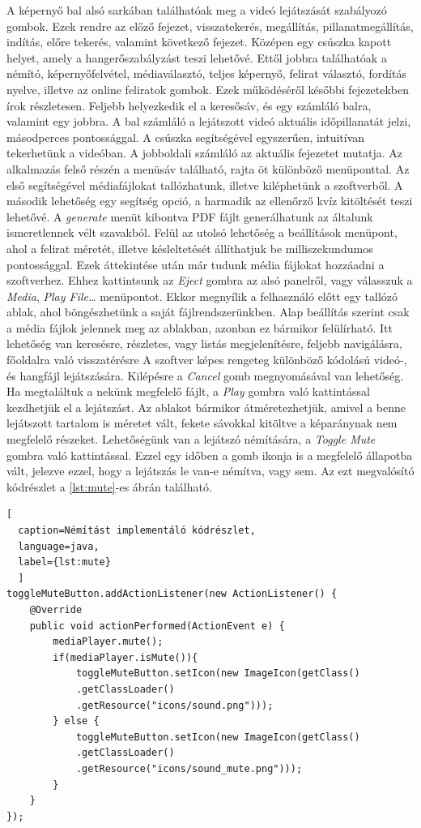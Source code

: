 A képernyő bal alsó sarkában találhatóak meg a videó lejátszását szabályozó gombok. Ezek rendre az előző fejezet, visszatekerés, megállítás, pillanatmegállítás, indítás, előre tekerés, valamint következő fejezet. Középen egy csúszka kapott helyet, amely a hangerőszabályzást teszi lehetővé. Ettől jobbra találhatóak a némító, képernyőfelvétel, médiaválasztó, teljes képernyő, felirat választó, fordítás nyelve, illetve az online feliratok gombok. Ezek működéséről későbbi fejezetekben írok részletesen. Feljebb helyezkedik el a keresősáv, és egy számláló balra, valamint egy jobbra. A bal számláló a lejátszott videó aktuális időpillanatát jelzi, másodperces pontossággal. A csúszka segítségével egyszerűen, intuitívan tekerhetünk a videóban. A jobboldali számláló az aktuális fejezetet mutatja. Az alkalmazás felső részén a menüsáv található, rajta öt különböző menüponttal. Az első segítségével médiafájlokat tallózhatunk, illetve kiléphetünk a szoftverből. A második lehetőség egy segítség opció, a harmadik az ellenőrző kvíz kitöltését teszi lehetővé. A \textit{generate} menüt kibontva PDF fájlt generálhatunk az általunk ismeretlennek vélt szavakból. Felül az utolsó lehetőség a beállítások menüpont, ahol a felirat méretét, illetve késleltetését állíthatjuk be milliszekundumos pontossággal. Ezek áttekintése után már tudunk média fájlokat hozzáadni a szoftverhez. Ehhez kattintsunk az \textit{Eject} gombra az alsó panelről, vagy válasszuk a \textit{Media}, \textit{Play File…} menüpontot. Ekkor megnyílik a felhasználó előtt egy tallózó ablak, ahol böngészhetünk a saját fájlrendszerünkben. Alap beállítás szerint csak a média fájlok jelennek meg az ablakban, azonban ez bármikor felülírható. Itt lehetőség van keresésre, részletes, vagy listás megjelenítésre, feljebb navigálásra, főoldalra való visszatérésre A szoftver képes rengeteg különböző kódolású videó-, és hangfájl lejátszására. Kilépésre a \textit{Cancel} gomb megnyomásával van lehetőség. Ha megtaláltuk a nekünk megfelelő fájlt, a \textit{Play} gombra való kattintással kezdhetjük el a lejátszást. Az ablakot bármikor átméretezhetjük, amivel a benne lejátszott tartalom is méretet vált, fekete sávokkal kitöltve a képaránynak nem megfelelő részeket. Lehetőségünk van a lejátszó némítására, a \textit{Toggle Mute} gombra való kattintással. Ezzel egy időben a gomb ikonja is a megfelelő állapotba vált, jelezve ezzel, hogy a lejátszás le van-e némítva, vagy sem. Az ezt megvalósító kódrészlet a \ref{lst:mute}-es ábrán található.

\begin{spacing}{1.25}
\begin{lstlisting}[
  caption=Némítást implementáló kódrészlet,
  language=java,
  label={lst:mute}
  ]
toggleMuteButton.addActionListener(new ActionListener() {
    @Override
    public void actionPerformed(ActionEvent e) {
        mediaPlayer.mute();
        if(mediaPlayer.isMute()){
            toggleMuteButton.setIcon(new ImageIcon(getClass()
            .getClassLoader()
            .getResource("icons/sound.png")));
        } else {
            toggleMuteButton.setIcon(new ImageIcon(getClass()
            .getClassLoader()
            .getResource("icons/sound_mute.png")));
        }
    }
});
\end{lstlisting}
\end{spacing}
